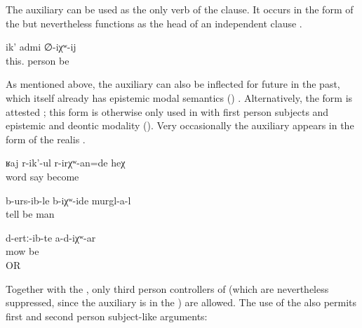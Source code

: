 The auxiliary can be used as the only verb of the clause. It occurs in the form of the  but nevertheless functions as the head of an independent clause .

\begin{exe}
	\ex	\label{ex:This is probably a man.}
	\gll	ik'	admi	∅-iχʷ-ij\\
		this.	person	be\\
	\glt	{}
\end{exe}

As mentioned above, the auxiliary can also be inflected for future in the past, which itself already has epistemic modal semantics () . Alternatively, the  form is attested ; this form is otherwise only used in  with first person subjects and epistemic and deontic modality (). Very occasionally the auxiliary appears in the form of the realis  .\largerpage

\begin{exe}
	\ex	\label{ex:‎She must have been scolding / probably she was scolding}
	\gll	ʁaj	r-ik'-ul	r-irχʷ-an=de	heχ\\
		word	say	become	\\
	\glt	{}

	\ex	\label{ex:‎Probably the men had already told it}
	\gll	b-urs-ib-le	b-iχʷ-ide	murgl-a-l\\
		tell	be	man	\\
	\glt	{}

	\ex	\label{ex:‎‎This is probably mowed (grass).}
	\gll	d-ertː-ib-te	a-d-iχʷ-ar\\
		mow 	be\\
	\glt	{} OR 
\end{exe}

Together with the , only third person controllers of  (which are nevertheless suppressed, since the auxiliary is in the ) are allowed. The use of the  also permits first and second person subject-like arguments:

